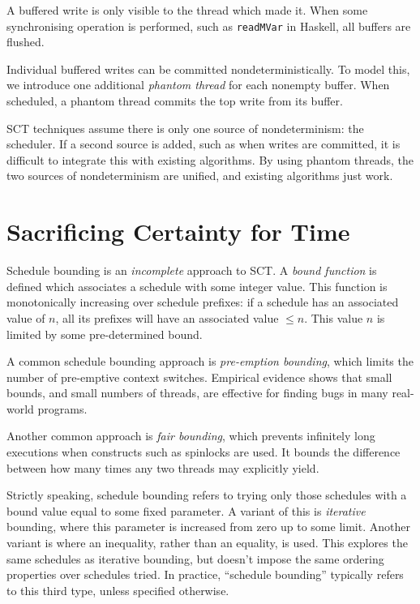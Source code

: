 A buffered write is only visible to the thread which made it.  When some
synchronising operation is performed, such as \verb|readMVar| in Haskell, all
buffers are flushed.

Individual buffered writes can be committed nondeterministically.  To model
this, we introduce one additional \emph{phantom thread} for each nonempty
buffer.  When scheduled, a phantom thread commits the top write from its buffer.

SCT techniques assume there is only one source of nondeterminism: the scheduler.
If a second source is added, such as when writes are committed, it is difficult
to integrate this with existing algorithms.  By using phantom threads, the two
sources of nondeterminism are unified, and existing algorithms just work.

\section{Sacrificing Certainty for Time}
\label{sec:sct-incomplete}

Schedule bounding\cite{emmi2011,musuvathi2008,musuvathi2007} is an
\emph{incomplete} approach to SCT\@.  A \emph{bound function} is defined which
associates a schedule with some integer value.  This function is monotonically
increasing over schedule prefixes: if a schedule has an associated value of $n$,
all its prefixes will have an associated value $\leq n$.  This value $n$ is
limited by some pre-determined bound.

A common schedule bounding approach is \emph{pre-emption
  bounding}\cite{musuvathi2007}, which limits the number of pre-emptive context
switches.  Empirical evidence\cite{thomson2014} shows that small bounds, and
small numbers of threads, are effective for finding bugs in many real-world
programs.

Another common approach is \emph{fair bounding}\cite{musuvathi2008}, which
prevents infinitely long executions when constructs such as spinlocks are used.
It bounds the difference between how many times any two threads may explicitly
yield.

Strictly speaking, schedule bounding refers to trying only those schedules with
a bound value equal to some fixed parameter.  A variant of this is
\emph{iterative} bounding, where this parameter is increased from zero up to
some limit.  Another variant is where an inequality, rather than an equality, is
used.  This explores the same schedules as iterative bounding, but doesn't
impose the same ordering properties over schedules tried.  In practice,
``schedule bounding'' typically refers to this third type, unless specified
otherwise.

